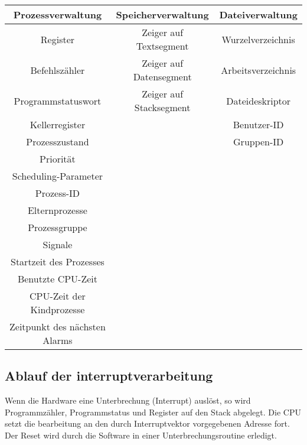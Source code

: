 \begin{tabular}{ | c | c | c | }
    \hline
    Prozessverwaltung             & Speicherverwaltung      & Dateiverwaltung    \\\hline
    Register                      & Zeiger auf Textsegment  & Wurzelverzeichnis  \\
    Befehlszähler                 & Zeiger auf Datensegment & Arbeitsverzeichnis \\
    Programmstatuswort            & Zeiger auf Stacksegment & Dateideskriptor    \\
    Kellerregister                &                         & Benutzer-ID        \\
    Prozesszustand                &                         & Gruppen-ID         \\
    Priorität                     &                         &                    \\
    Scheduling-Parameter          &                         &                    \\
    Prozess-ID                    &                         &                    \\
    Elternprozesse                &                         &                    \\
    Prozessgruppe                 &                         &                    \\
    Signale                       &                         &                    \\
    Startzeit des Prozesses       &                         &                    \\
    Benutzte CPU-Zeit             &                         &                    \\
    CPU-Zeit der Kindprozesse     &                         &                    \\
    Zeitpunkt des nächsten Alarms &                         &                    \\ \hline
\end{tabular}

\subsection{Ablauf der interruptverarbeitung}

Wenn die Hardware eine Unterbrechung (Interrupt) auslöst, so wird
Programmzähler, Programmstatus und Register auf den Stack abgelegt. Die CPU
setzt die bearbeitung an den durch Interruptvektor vorgegebenen Adresse fort.
Der Reset wird durch die Software in einer Unterbrechungsroutine erledigt.

